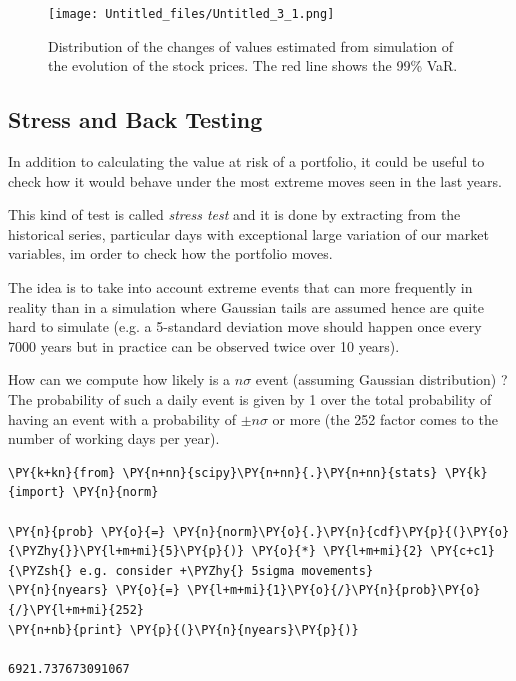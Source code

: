 \begin{figure}[htb]
	\centering
	\texttt{[image: Untitled\_files/Untitled\_3\_1.png]}
	\caption{Distribution of the changes of values estimated from simulation of the evolution of the stock prices. The red line shows the 99\% VaR.}
	\label{fig:mc2_var}
\end{figure}


\subsection{Stress and Back Testing}\label{stress-testing-and-back-testing}

In addition to calculating the value at risk of a portfolio, it could be useful to 
check how it would behave under the most extreme moves seen in the last years.

This kind of test is called \emph{stress test} and it is done by extracting from the historical series, particular days with exceptional large variation of our market variables, im order to check
how the portfolio moves.
 
The idea is to take into account extreme events that can more frequently in reality 
than in a simulation where Gaussian tails are assumed hence are quite hard to simulate
(e.g. a 5-standard deviation move should happen once every 7000 years
but in practice can be observed twice over 10 years).

How can we compute how likely is a $n\sigma$ event (assuming Gaussian distribution) ?
The probability of such a daily event is given by 1 over the total probability of having an 
event with a probability of $\pm n\sigma$ or more (the 252 factor comes to the number of working days per year).

\begin{tcolorbox}[breakable, size=fbox, boxrule=1pt, pad at break*=1mm,colback=cellbackground, colframe=cellborder]
\begin{Verbatim}[commandchars=\\\{\}]
\PY{k+kn}{from} \PY{n+nn}{scipy}\PY{n+nn}{.}\PY{n+nn}{stats} \PY{k}{import} \PY{n}{norm}

\PY{n}{prob} \PY{o}{=} \PY{n}{norm}\PY{o}{.}\PY{n}{cdf}\PY{p}{(}\PY{o}{\PYZhy{}}\PY{l+m+mi}{5}\PY{p}{)} \PY{o}{*} \PY{l+m+mi}{2} \PY{c+c1}{\PYZsh{} e.g. consider +\PYZhy{} 5sigma movements}
\PY{n}{nyears} \PY{o}{=} \PY{l+m+mi}{1}\PY{o}{/}\PY{n}{prob}\PY{o}{/}\PY{l+m+mi}{252}
\PY{n+nb}{print} \PY{p}{(}\PY{n}{nyears}\PY{p}{)}

6921.737673091067
    \end{Verbatim}
\end{tcolorbox}

